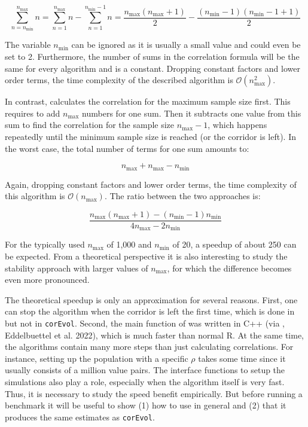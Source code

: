 \begin{equation}
  \sum_{n=n_\mathrm{min}}^{n_\mathrm{max}}n = \sum_{n=1}^{n_\mathrm{max}}n - \sum_{n=1}^{n_\mathrm{min}-1}n = \frac{n_\mathrm{max}\left( n_\mathrm{max}+1\right)}{2} - \frac{\left( n_\mathrm{min}-1\right) \left( n_\mathrm{min}-1+1\right)}{2}
  \label{eq:termscorevol}
\end{equation}

The variable \(n_\mathrm{min}\) can be ignored as it is usually a small value and could even be set to 2. Furthermore, the number of sums in the correlation formula will be the same for every algorithm and is a constant. Dropping constant factors and lower order terms, the time complexity of the described algorithm is \(\mathcal{O}(n_\mathrm{max}^2)\).

In contrast,  calculates the correlation for the maximum sample size first. This requires to add \(n_\mathrm{max}\) numbers for one sum. Then it subtracts one value from this sum to find the correlation for the sample size \(n_\mathrm{max}-1\), which happens repeatedly until the minimum sample size is reached (or the corridor is left). In the worst case, the total number of terms for one sum amounts to:

\begin{equation}
n_\mathrm{max}+n_\mathrm{max}-n_\mathrm{min}
  \label{eq:termsfastpos}
\end{equation}

Again, dropping constant factors and lower order terms, the time complexity of this algorithm is \(\mathcal{O}(n_\mathrm{max})\). The ratio between the two approaches is:

\begin{equation}
  \frac{n_\mathrm{max}\left(n_\mathrm{max}+1\right) -\left(n_\mathrm{min}-1\right)n_\mathrm{min}}{4n_\mathrm{max}-2n_\mathrm{min}}
  \label{eq:ratio}
\end{equation}

For the typically used \(n_\mathrm{max}\) of 1,000 and \(n_\mathrm{min}\) of 20, a speedup of about 250 can be expected. From a theoretical perspective it is also interesting to study the stability approach with larger values of \(n_\mathrm{max}\), for which the difference becomes even more pronounced.

The theoretical speedup is only an approximation for several reasons. First, one can stop the algorithm when the corridor is left the first time, which is done in  but not in \texttt{corEvol}. Second, the main function of  was written in C++ (via , Eddelbuettel et al. 2022), which is much faster than normal R. At the same time, the algorithms contain many more steps than just calculating correlations. For instance, setting up the population with a specific \(\rho\) takes some time since it usually consists of a million value pairs. The interface functions to setup the simulations also play a role, especially when the algorithm itself is very fast. Thus, it is necessary to study the speed benefit empirically. But before running a benchmark it will be useful to show (1) how to use  in general and (2) that it produces the same estimates as \texttt{corEvol}.

